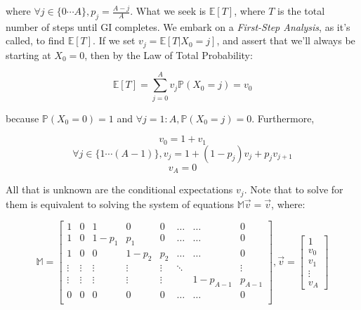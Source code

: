 \documentclass{article}
\begin{document}
\begin{center}
\end{center}

where $\forall j \in \{0 \cdots A\}, p_j=\frac{A-j}{A}$. What we seek is $\mathbb{E}[T]$, where $T$ is the total number of steps until GI completes. We embark on a \textit{First-Step Analysis}, as it's called, to find $\mathbb{E}[T]$. If we set $v_j = \mathbb{E}[T|X_0 = j]$, and assert that we'll always be starting at $X_0 = 0$, then by the Law of Total Probability:

\[
\mathbb{E}[T] = \sum^A_{j=0} v_j\mathbb{P}(X_0=j) = v_0
\]

because $\mathbb{P}(X_0=0) = 1$ and $\forall j=1:A, \mathbb{P}(X_0=j) = 0$. Furthermore,

\[
v_0 = 1 + v_1
\]\[
\forall j \in \{1 \cdots (A-1)\}, v_j = 1+(1-p_j)v_j + p_jv_{j+1}
\]\[
v_A = 0
\]

All that is unknown are the conditional expectations $v_j$. Note that to solve for them is equivalent to solving the system of equations $\mathbb{M}\vec{v}=\vec{v}$, where:

\[
\mathbb{M} = \begin{bmatrix}
    1 & 0 & 1 & 0 & 0 & \hdots & \hdots & 0 \\
    1 & 0 & 1-p_1 & p_1 & 0 & \hdots & \hdots & 0 \\
    1 & 0 & 0 & 1-p_2 & p_2 & \hdots & \hdots & 0 \\
    \vdots & \vdots & \vdots & \vdots & \vdots & \ddots & & \vdots \\
    \vdots & \vdots & \vdots & \vdots & \vdots & & 1-p_{A-1} & p_{A-1} \\
    0 & 0 & 0 & 0 & 0 & \hdots & \hdots & 0 \\
\end{bmatrix},
\vec{v} = \begin{bmatrix}
    1 \\
    v_0 \\
    v_1 \\
    \vdots \\
    v_A
\end{bmatrix}
\]
\end{document}
